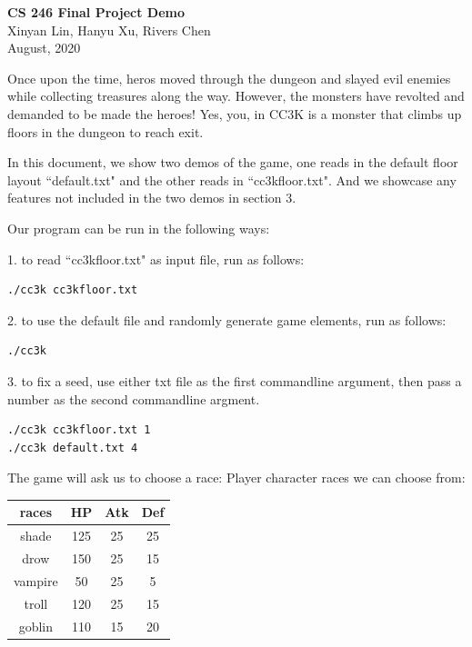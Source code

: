 \documentclass[11pt]{article}
\theoremstyle{plain}
\begin{document}
\begin{center}
{\LARGE \textbf{CS 246 Final Project Demo}}\\
\vspace{0.15 in}
Xinyan Lin, Hanyu Xu, Rivers Chen\\ 
\vspace{0.07 in} August, 2020
\end{center}

Once upon the time, heros moved through the dungeon and slayed evil enemies 
while collecting treasures along the way. However, the monsters have revolted
and demanded to be made the heroes!
Yes, you, in CC3K is a monster that climbs up floors in the dungeon to
reach exit.

In this document, we show two demos of the game, one reads in the default
floor layout ``default.txt" and the other reads in ``cc3kfloor.txt".
And we showcase any features not included in the two demos in section 3.

Our program can be run in the following ways:

1. to read ``cc3kfloor.txt" as input file, run as follows:
\begin{lstlisting}
./cc3k cc3kfloor.txt
\end{lstlisting}
2. to use the default file and randomly generate game elements, run as follows:
\begin{lstlisting}
./cc3k
\end{lstlisting}
3. to fix a seed, use either txt file as the first commandline argument,
then pass a number as the second commandline argment. 
\begin{lstlisting}
./cc3k cc3kfloor.txt 1
./cc3k default.txt 4
\end{lstlisting}

The game will ask us to choose a race:
Player character races we can choose from:
\begin{center}
\begin{tabular}{|c|c|c|c|}
	\hline
	races	& HP	& Atk	& Def	\\	\hline
	shade	& 125	& 25	& 25	\\	\hline
	drow	& 150	& 25	& 15	\\	\hline
	vampire & 50	& 25	& 5		\\	\hline
	troll	& 120	& 25	& 15	\\	\hline
	goblin	& 110	& 15	& 20	\\	\hline
\end{tabular}
\end{center}
\end{document}
